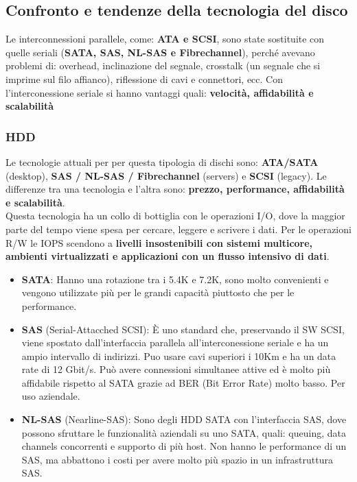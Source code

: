 \documentclass[8pt,a4paper]{extarticle}
\begin{document}
\begin{multicols*}{4}
		\subsection{Confronto e tendenze della tecnologia del disco}
		Le interconnessioni parallele, come: \textbf{ATA e SCSI}, sono state sostituite con quelle seriali (\textbf{SATA, SAS, NL-SAS e Fibrechannel}), perché avevano problemi di: overhead, inclinazione del segnale, crosstalk (un segnale che si imprime sul filo affianco), riflessione di cavi e connettori, ecc. Con l'interconessione seriale si hanno vantaggi quali: \textbf{velocità, affidabilità e scalabilità}
		
		\subsubsection{HDD}
		Le tecnologie attuali per per questa tipologia di dischi sono: \textbf{ATA/SATA} (desktop), \textbf{SAS / NL-SAS / Fibrechannel} (servers) e \textbf{SCSI} (legacy). Le differenze tra una tecnologia e l'altra sono: \textbf{prezzo, performance, affidabilità e scalabilità}. \\ Questa tecnologia ha un collo di bottiglia con le operazioni I/O, dove la maggior parte del tempo viene spesa per cercare, leggere e scrivere i dati. Per le operazioni R/W le IOPS scendono a \textbf{livelli insostenibili con sistemi multicore, ambienti virtualizzati e applicazioni con un flusso intensivo di dati}.
		\begin{itemize}
			\item \textbf{SATA}:  Hanno una rotazione tra i 5.4K e 7.2K, sono molto convenienti e vengono utilizzate più per le grandi capacità piuttosto che per le performance.
			\item \textbf{SAS} (Serial-Attacched SCSI): È uno standard che, preservando il SW SCSI, viene spostato dall'interfaccia parallela all'interconessione seriale e ha un ampio intervallo di indirizzi. Puo usare cavi superiori i 10Km e ha un data rate di 12 Gbit/s. Può avere connessioni simultanee attive ed è molto più affidabile rispetto al SATA grazie ad BER (Bit Error Rate) molto basso. Per uso aziendale. 
			\item \textbf{NL-SAS} (Nearline-SAS): Sono degli HDD SATA con l'interfaccia SAS, dove possono sfruttare le funzionalità aziendali su uno SATA, quali: queuing, data channels concorrenti e supporto di più host. Non hanno le performance di un SAS, ma abbattono i costi per avere molto più spazio in un infrastruttura SAS.
		\end{itemize}
		

\end{multicols*}
\end{document}

